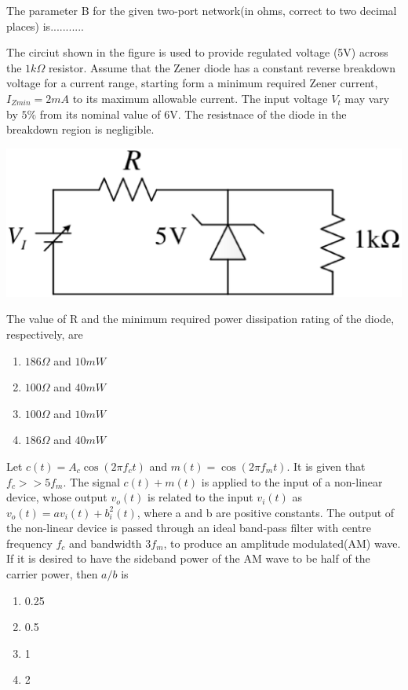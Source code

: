 The parameter B for the given two-port network(in ohms, correct to two decimal places) is...........

\item The circiut shown in the figure is used to provide regulated voltage (5V) across the $1k\Omega$ resistor. Assume that the Zener diode has a constant reverse breakdown voltage for a current range, starting form a minimum required Zener current, $I_{Z min} = 2mA$ to its maximum allowable current. The input voltage $V_t$ may vary by $5\%$ from its nominal value of 6V. The resistnace of the diode in the breakdown region is negligible.

\includegraphics[scale=0.3]{36}

The value of R and the minimum required power dissipation rating of the diode, respectively, are
\begin{enumerate}
\item $186\Omega$ and $10m W$
\item $100\Omega$ and $40m W$
\item $100\Omega$ and $10m W$
\item $186\Omega$ and $40m W$
\end{enumerate}

\item Let $c(t) = A_c \cos(2\pi f_ct)$ and $m(t) = \cos(2\pi f_mt)$. It is given that $f_c >> 5f_m$. The signal $c(t) + m(t)$ is applied to the input of a non-linear device, whose output $v_o(t)$ is related to the input $v_i(t)$ as $v_o(t) = av_i(t) + b_{i}^{2}(t)$, where a and b are positive constants. The output of the non-linear device is passed through an ideal band-pass filter with centre frequency $f_c$ and bandwidth $3f_m$, to produce an amplitude modulated(AM) wave. If it is desired to have the sideband power of the AM wave to be half of the carrier power, then $a/b$ is
\begin{enumerate}
\item 0.25
\item 0.5
\item 1
\item 2
\end{enumerate}

